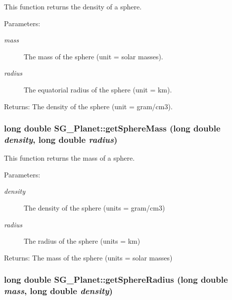 This function returns the density of a sphere. 

\begin{Desc}
\item[Parameters:]
\begin{description}
\item[{\em mass}]The mass of the sphere (unit = solar masses). \item[{\em radius}]The equatorial radius of the sphere (unit = km). \end{description}
\end{Desc}
\begin{Desc}
\item[Returns:]The density of the sphere (unit = gram/cm3). \end{Desc}
\subsubsection{\setlength{\rightskip}{0pt plus 5cm}long double SG\_\-Planet::get\-Sphere\-Mass (long double {\em density}, long double {\em radius})\hspace{0.3cm}{\tt  [protected]}}\label{class_s_g___planet_b33}


This function returns the mass of a sphere. 

\begin{Desc}
\item[Parameters:]
\begin{description}
\item[{\em density}]The density of the sphere (units = gram/cm3) \item[{\em radius}]The radius of the sphere (units = km) \end{description}
\end{Desc}
\begin{Desc}
\item[Returns:]The mass of the sphere (units = solar masses) \end{Desc}
\subsubsection{\setlength{\rightskip}{0pt plus 5cm}long double SG\_\-Planet::get\-Sphere\-Radius (long double {\em mass}, long double {\em density})\hspace{0.3cm}{\tt  [protected]}}\label{class_s_g___planet_b34}



